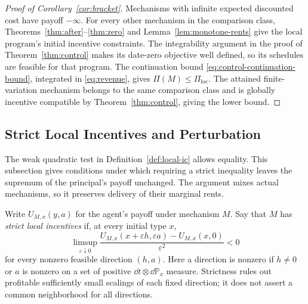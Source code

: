 \documentclass[12pt]{article}
\begin{document}
\begin{proof}[Proof of Corollary~\ref{cor:bracket}]
Mechanisms with infinite expected discounted cost have payoff
\(-\infty\). For every other mechanism in the comparison class,
Theorems~\ref{thm:after}--\ref{thm:zero} and
Lemma~\ref{lem:monotone-rents} give the local program's initial
incentive constraints. The integrability argument in the proof of
Theorem~\ref{thm:control} makes its date-zero objective well defined,
so its schedules are feasible for that program. The continuation bound
\eqref{eq:control-continuation-bound}, integrated in
\eqref{eq:revenue}, gives \(\Pi(M)\leq\Pi_{\mathrm{loc}}\).
The attained finite-variation mechanism belongs to the same
comparison class and is globally incentive compatible by
Theorem~\ref{thm:control}, giving the lower bound.
\end{proof}

\subsection{Strict Local Incentives and Perturbation}
\label{app:strict-local}

The weak quadratic test in Definition~\ref{def:local-ic} allows
equality. This subsection gives conditions under which requiring a
strict inequality leaves the supremum of the principal's payoff
unchanged. The argument mixes actual mechanisms, so it preserves
delivery of their marginal rents.

Write \(U_{M,x}(y,a)\) for the agent's payoff under mechanism \(M\).
Say that \(M\) has \emph{strict local incentives} if, at every initial
type \(x\),
\begin{equation}\label{eq:strict-local}
  \limsup_{\varepsilon\downarrow0}
  \frac{U_{M,x}(x+\varepsilon h,\varepsilon a)-U_{M,x}(x,0)}
       {\varepsilon^2}<0
\end{equation}
for every nonzero feasible direction \((h,a)\). Here a direction is
nonzero if \(h\ne0\) or \(a\) is nonzero on a set of positive
\(\dd t\otimes\dd\mathbb P_x\) measure. Strictness rules out
profitable sufficiently small scalings of each fixed direction; it
does not assert a common neighborhood for all directions.
\end{document}
